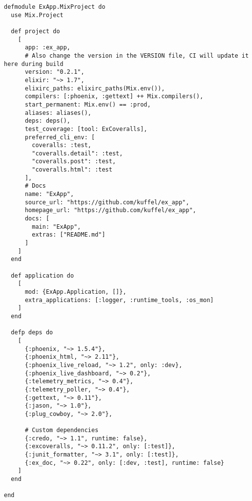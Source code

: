 \lstset{language=bash}
\begin{lstlisting}[frame=htrbl, caption={mix.exs}, label={lst:projekt_mixfile}]
defmodule ExApp.MixProject do
  use Mix.Project

  def project do
    [
      app: :ex_app,
      # Also change the version in the VERSION file, CI will update it here during build
      version: "0.2.1",
      elixir: "~> 1.7",
      elixirc_paths: elixirc_paths(Mix.env()),
      compilers: [:phoenix, :gettext] ++ Mix.compilers(),
      start_permanent: Mix.env() == :prod,
      aliases: aliases(),
      deps: deps(),
      test_coverage: [tool: ExCoveralls],
      preferred_cli_env: [
        coveralls: :test,
        "coveralls.detail": :test,
        "coveralls.post": :test,
        "coveralls.html": :test
      ],
      # Docs
      name: "ExApp",
      source_url: "https://github.com/kuffel/ex_app",
      homepage_url: "https://github.com/kuffel/ex_app",
      docs: [
        main: "ExApp",
        extras: ["README.md"]
      ]
    ]
  end

  def application do
    [
      mod: {ExApp.Application, []},
      extra_applications: [:logger, :runtime_tools, :os_mon]
    ]
  end

  defp deps do
    [
      {:phoenix, "~> 1.5.4"},
      {:phoenix_html, "~> 2.11"},
      {:phoenix_live_reload, "~> 1.2", only: :dev},
      {:phoenix_live_dashboard, "~> 0.2"},
      {:telemetry_metrics, "~> 0.4"},
      {:telemetry_poller, "~> 0.4"},
      {:gettext, "~> 0.11"},
      {:jason, "~> 1.0"},
      {:plug_cowboy, "~> 2.0"},

      # Custom dependencies
      {:credo, "~> 1.1", runtime: false},
      {:excoveralls, "~> 0.11.2", only: [:test]},
      {:junit_formatter, "~> 3.1", only: [:test]},
      {:ex_doc, "~> 0.22", only: [:dev, :test], runtime: false}
    ]
  end

end
\end{lstlisting}